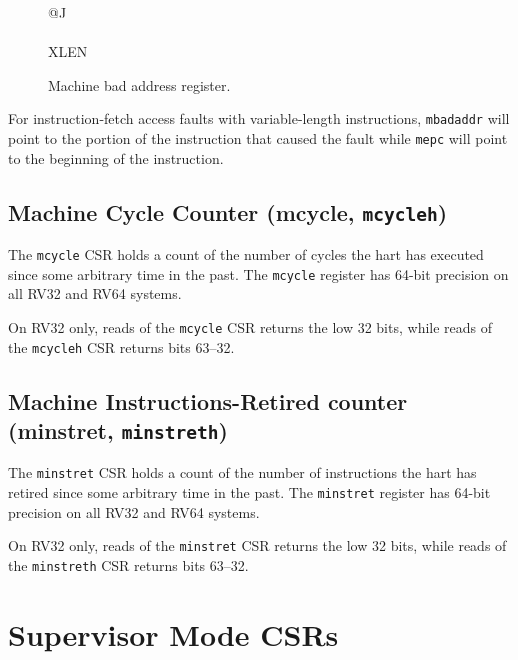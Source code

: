 \ifdefined\MARKDOWN
\else
\begin{figure}[htb]
	{\footnotesize
		\begin{center}
			\begin{tabular}{@{}J}
				 \\
				\hline
				 \\
				\hline
				XLEN \\
			\end{tabular}
		\end{center}
	}
	\vspace{-0.1in}
	\caption{Machine bad address register.}
	\label{fig:mbadaddrreg}
\end{figure}
\fi

For instruction-fetch access faults with variable-length instructions,
\texttt{mbadaddr} will point to the portion of the instruction that caused the
fault while \texttt{mepc} will point to the beginning of the instruction.

\subsection{Machine Cycle Counter (mcycle,
\texttt{mcycleh})}\label{machine-cycle-counter-mcycle-mcycleh}

The \texttt{mcycle} CSR holds a count of the number of cycles the hart has
executed since some arbitrary time in the past. The \texttt{mcycle} register has
64-bit precision on all RV32 and RV64 systems.

On RV32 only, reads of the \texttt{mcycle} CSR returns the low 32 bits, while
reads of the \texttt{mcycleh} CSR returns bits 63--32.

\subsection{Machine Instructions-Retired counter (minstret,
\texttt{minstreth})} \label{machine-instructions-retired-counter-minstret-minstreth}

The \texttt{minstret} CSR holds a count of the number of instructions the hart
has retired since some arbitrary time in the past. The \texttt{minstret}
register has 64-bit precision on all RV32 and RV64 systems.

On RV32 only, reads of the \texttt{minstret} CSR returns the low 32 bits, while
reads of the \texttt{minstreth} CSR returns bits 63--32.

\section{Supervisor Mode CSRs}\label{supervisor-mode-csrs}

